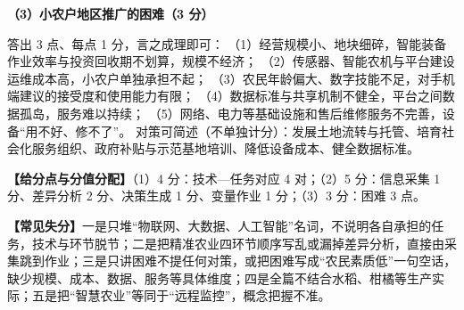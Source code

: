 \documentclass[a4paper,11pt]{article}
\begin{document}
\textbf{（3）小农户地区推广的困难（3 分）}
\begin{analysis}
答出 3 点、每点 1 分，言之成理即可：
（1）经营规模小、地块细碎，智能装备作业效率与投资回收期不划算，规模不经济；
（2）传感器、智能农机与平台建设运维成本高，小农户单独承担不起；
（3）农民年龄偏大、数字技能不足，对手机端建议的接受度和使用能力有限；
（4）数据标准与共享机制不健全，平台之间数据孤岛，服务难以持续；
（5）网络、电力等基础设施和售后维修服务不完善，设备“用不好、修不了”。
对策可简述（不单独计分）：发展土地流转与托管、培育社会化服务组织、政府补贴与示范基地培训、降低设备成本、健全数据标准。
\end{analysis}

\textbf{【给分点与分值分配】}（1）4 分：技术—任务对应 4 对；（2）5 分：信息采集 1 分、差异分析 2 分、决策生成 1 分、变量作业 1 分；（3）3 分：困难 3 点。

\textbf{【常见失分】}一是只堆“物联网、大数据、人工智能”名词，不说明各自承担的任务，技术与环节脱节；二是把精准农业四环节顺序写乱或漏掉差异分析，直接由采集跳到作业；三是只讲困难不提任何对策，或把困难写成“农民素质低”一句空话，缺少规模、成本、数据、服务等具体维度；四是全篇不结合水稻、柑橘等生产实际；五是把“智慧农业”等同于“远程监控”，概念把握不准。
\end{document}
